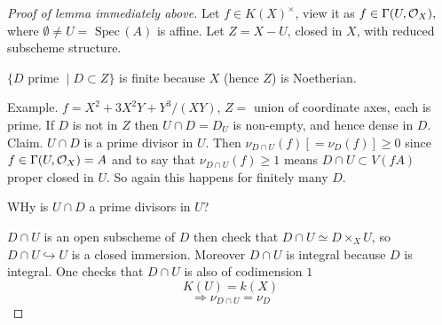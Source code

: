 \documentclass[11pt]{article}
\newcommand{\spec}{\text{ Spec}\,}
\newcommand{\calo}{{\cal O}}
\newcommand{\Lrta}{\Longrightarrow}
\newcommand{\inj}{\hookrightarrow}
\begin{document}
\begin{proof}[Proof of lemma immediately above]
Let $f\in K(X)^\times$, view it as $f\in \Gamma(U,\calo_X),$ where $\emptyset \neq U=\spec(A)$ is affine. Let $Z=X-U$, closed in $X$, with reduced subscheme structure.

$\{D\text{ prime }\mid D\subset Z \}$ is finite because $X$ (hence $Z$) is  Noetherian.

Example. $f=X^2+3X^2Y+Y^3/(XY)$, $Z=$ union of coordinate axes, each is prime. If $D$ is not in $Z$ then $U\cap D=D_U$ is non-empty, and hence dense in $D$. Claim. $U\cap D$ is a prime divisor in $U$. Then $\nu_{D\cap U}(f)[=\nu_D(f)]\geq 0$ since $f\in \Gamma(U,\calo_X)=A$ and to say that $\nu_{D\cap U}(f)\geq 1$ means $D\cap U\subset V(fA)$ proper closed in $U$. So again this happens for finitely many $D$.

WHy is $U\cap D$ a prime divisors in $U$?
\begin{center}




\end{center}
$D\cap U$ is an open subscheme of $D$ then check that $D\cap U\simeq D\times_X U$, so $D\cap U\inj U$ is a closed immersion. Moreover $D\cap U$ is integral because $D$ is integral. One checks that $D\cap U$ is also of codimension $1$
$$
K(U)=k(X)
$$
$$
\Lrta \nu_{D\cap U}=\nu_D
$$
\end{proof}
\end{document}
